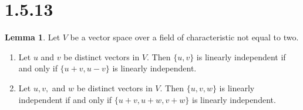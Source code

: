 \documentclass{article}
\theoremstyle{definition}
\newtheorem{lemma}[theorem]{Lemma}
\begin{document}
\newpage

\section{1.5.13}

\begin{lemma}
Let \( V \) be a vector space over a field of characteristic not equal to two.
\begin{enumerate}
    \item[(a)] Let \( u \) and \( v \) be distinct vectors in \( V \). Then \( \{u, v\} \) is linearly independent if and only if \( \{u + v, u - v\} \) is linearly independent.
    
    \item[(b)] Let \( u, v, \) and \( w \) be distinct vectors in \( V \). Then \( \{u, v, w\} \) is linearly independent if and only if \( \{u + v, u + w, v + w\} \) is linearly independent.
\end{enumerate}
\end{lemma}
\end{document}
